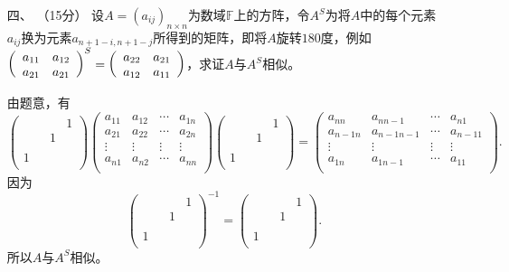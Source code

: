 \begin{enumerate}[1~]
\item[四、]（15分）
设$A = \left( a _ { i j } \right) _ { n \times n }$为数域$\mathbb{F}$上的方阵，令$A^S$为将$A$中的每个元素$a_{ij}$换为元素$a_{n+1-i, n+1-j}$所得到的矩阵，即将$A$旋转$180$度，例如$\left( \begin{array} { l l } { a _ { 11 } } & { a _ { 12 } } \\ { a _ { 21 } } & { a _ { 21 } } \end{array} \right) ^ { S } = \left( \begin{array} { l l } { a _ { 22 } } & { a _ { 21 } } \\ { a _ { 12 } } & { a _ { 11 } } \end{array} \right)$，求证$A$与$A^S$相似。
\begin{solution}
由题意，有\[
\left( \begin{matrix}
	&		&		&		1\\
	&		&		1&		\\
	&		&		&		\\
	1&		&		&		\\
\end{matrix} \right) \left( \begin{matrix}
	a_{11}&		a_{12}&		\cdots&		a_{1n}\\
	a_{21}&		a_{22}&		\cdots&		a_{2n}\\
	\vdots&		\vdots&		\vdots&		\vdots\\
	a_{n1}&		a_{n2}&		\cdots&		a_{nn}\\
\end{matrix} \right) \left( \begin{matrix}
	&		&		&		1\\
	&		&		1&		\\
	&		&		&		\\
	1&		&		&		\\
\end{matrix} \right) =\left( \begin{matrix}
	a_{nn}&		a_{nn-1}&		\cdots&		a_{n1}\\
	a_{n-1n}&		a_{n-1n-1}&		\cdots&		a_{n-11}\\
	\vdots&		\vdots&		\vdots&		\vdots\\
	a_{1n}&		a_{1n-1}&		\cdots&		a_{11}\\
\end{matrix} \right) .
\]
因为\[
\left( \begin{matrix}
	&		&		&		1\\
	&		&		1&		\\
	&		&		&		\\
	1&		&		&		\\
\end{matrix} \right)^{-1}=\left( \begin{matrix}
	&		&		&		1\\
	&		&		1&		\\
	&		&		&		\\
	1&		&		&		\\
\end{matrix} \right) .
\]
所以$A$与$A^S$相似。
\end{solution}



\end{enumerate}
